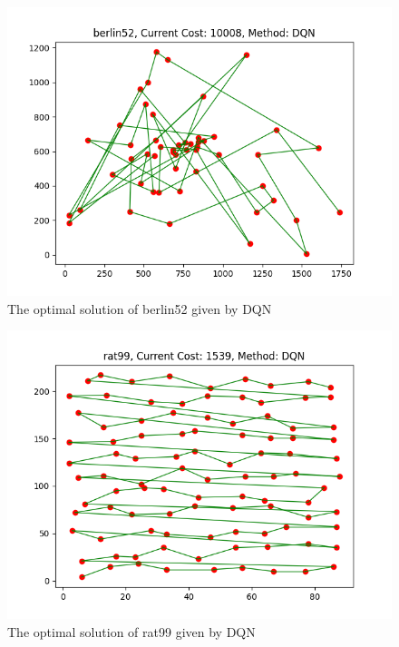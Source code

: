\documentclass[twocolumn, a4paper]{extarticle}
\begin{document}
\begin{figure}[H]
	\centering
	\includegraphics[width=0.95\linewidth]{figure/DQN_berlin52}
	\caption{The optimal solution of berlin52 given by DQN}
	\label{fig:DQNberlin52}
\end{figure}

\begin{figure}[H]
	\centering
	\includegraphics[width=0.95\linewidth]{figure/DQN_rat99}
	\caption{The optimal solution of rat99 given by DQN}
	\label{fig:DQNrat99}
\end{figure}
\end{document}
